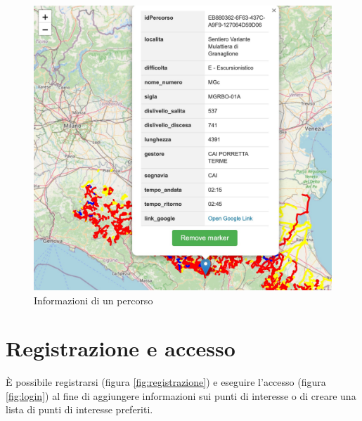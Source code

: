 \begin{figure}[h]
\begin{center}                      
\includegraphics[width=12cm]{images/Informazioni percorso.jpg}
\caption[Dimostrazione informazioni mappa]{Informazioni di un percorso}\label{fig:info}
\end{center}
\end{figure}

\section{Registrazione e accesso}
È possibile registrarsi (figura \ref{fig:registrazione}) e eseguire l'accesso (figura \ref{fig:login}) al fine di aggiungere informazioni sui punti di interesse o di creare una lista di punti di interesse preferiti.

